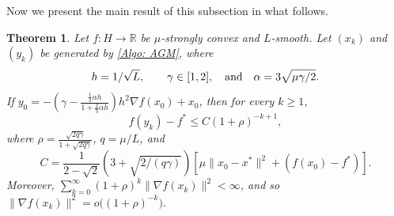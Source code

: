 \documentclass[pdflatex,sn-mathphys-num]{sn-jnl}
\theoremstyle{thmstyleone}
\newtheorem{theorem}{Theorem}
\theoremstyle{thmstyletwo}
\theoremstyle{thmstylethree}
\newcommand{\qbox}[1]{\quad\hbox{#1}\quad}
\newcommand{\R}{\mathbb{R}}
\begin{document}
Now we present the main result of this subsection in what follows.


\begin{theorem} \label{T:Algorithm_2}
Let $f:H\to\R$ be $\mu$-strongly convex and $L$-smooth. Let $(x_k)$ and $(y_k)$ be generated by \eqref{Algo: AGM}, where
$$ h=1/\sqrt{L},\qbox{} \gamma\in[1,2],\qbox{and}\alpha=3\sqrt{\mu\gamma/2}. $$
If $y_0 = -\left( \gamma - \frac{ \frac{1}{3}\alpha h }{1+ \frac{2}{3}\alpha h } \right)h^2\nabla f(x_0) + x_0 $, then for every $k\ge 1$,
$$ f(y_k) - f^* \le C (1+\rho)^{-k+1}, $$
where $\rho = \frac{\sqrt{2q\gamma}}{1+\sqrt{2q\gamma}}$, $q=\mu/L$, and
$$ C = \frac{1}{2-\sqrt{2}} \left( 3 + \sqrt{2/(q\gamma)} \right) \left[ \mu \| x_0 - x^* \|^2 + \left( f(x_0) - f^* \right)  \right]. $$
Moreover, $\sum_{k=0}^\infty (1+\rho)^k \| \nabla f(x_k) \|^2 < \infty$, and so $\| \nabla f(x_k) \|^2=o\big((1+\rho)^{-k}\big)$. 
\end{theorem}
\end{document}
